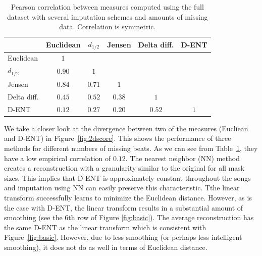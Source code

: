 \documentclass{article}
\begin{document}
\begin{table}[t]
    \begin{center}
      \begin{tabular}{@{}l c c c c c @{}}
        \toprule
                            & Euclidean       & $d_{1/2}$ & Jensen & Delta diff. & D-ENT \\ 
        \midrule
        Euclidean           & $1$             &  &  &  &  \\ 
        $d_{1/2}$             & $0.90$          & $1$    &  &  &  \\ 
        Jensen              & $0.84$          & $0.71$ & $1$    &  &  \\ 
        Delta diff. & $\mathbf{0.45}$ & $0.52$ & $0.38$ & $1$ &  \\ 
        D-ENT               & $\mathbf{0.12}$ & $0.27$ & $0.20$  & $0.52$ & $1$ \\
        \bottomrule
      \end{tabular}
      \caption{Pearson correlation between measures computed using the full dataset 
               with several imputation schemes and amounts of missing data.
               Correlation is symmetric.}
      \label{tab:corrs}
    \end{center}
\end{table}

We take a closer look at the divergence between two of the measures
(Eucliean and D-ENT) in Figure~\ref{fig:2dscore}.  This shows the
performance of three methods for different numbers of missing beats.
As we can see from Table~\ref{tab:corrs}, they have a low empirical
correlation of $0.12$.  The nearest neighbor (NN) method creates a
reconstruction with a granularity similar to the original for all mask
sizes.  This implies that D-ENT is approximately constant throughout
the songs and imputation using NN can easily preserve this
characteristic.  Tthe linear transform successfully learns to minimize
the Euclidean distance.  However, as is the case with D-ENT, the
linear transform results in a substantial amount of smoothing (see the
$6$th row of Figure \ref{fig:basic}). The average reconstruction has
the same D-ENT as the linear transform which is consistent with
Figure~\ref{fig:basic}.  However, due to less smoothing (or perhaps
less intelligent smoothing), it does not do as well in terms of
Euclidean distance.
\end{document}
